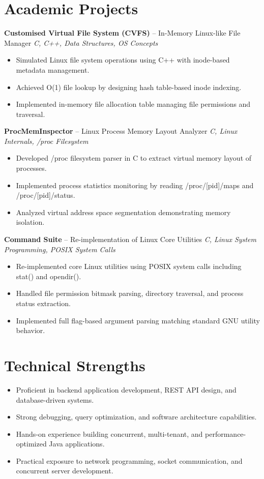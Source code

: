 \documentclass[10.5pt,a4paper]{article}
\begin{document}
\section{Academic Projects}
\textbf{Customised Virtual File System (CVFS)} -- In-Memory Linux-like File Manager \hfill \textit{C, C++, Data Structures, OS Concepts}
\begin{itemize}
  \item Simulated Linux file system operations using C++ with inode-based metadata management.
  \item Achieved O(1) file lookup by designing hash table-based inode indexing.
  \item Implemented in-memory file allocation table managing file permissions and traversal.
\end{itemize}
\vspace{4pt}
\textbf{ProcMemInspector} -- Linux Process Memory Layout Analyzer \hfill \textit{C, Linux Internals, /proc Filesystem}
\begin{itemize}
  \item Developed /proc filesystem parser in C to extract virtual memory layout of processes.
  \item Implemented process statistics monitoring by reading /proc/[pid]/maps and /proc/[pid]/status.
  \item Analyzed virtual address space segmentation demonstrating memory isolation.
\end{itemize}
\vspace{4pt}
\textbf{Command Suite} -- Re-implementation of Linux Core Utilities \hfill \textit{C, Linux System Programming, POSIX System Calls}
\begin{itemize}
  \item Re-implemented core Linux utilities using POSIX system calls including stat() and opendir().
  \item Handled file permission bitmask parsing, directory traversal, and process status extraction.
  \item Implemented full flag-based argument parsing matching standard GNU utility behavior.
\end{itemize}
\section{Technical Strengths}
\begin{itemize}
  \item Proficient in backend application development, REST API design, and database-driven systems.
  \item Strong debugging, query optimization, and software architecture capabilities.
  \item Hands-on experience building concurrent, multi-tenant, and performance-optimized Java applications.
  \item Practical exposure to network programming, socket communication, and concurrent server development.
\end{itemize}
\end{document}
